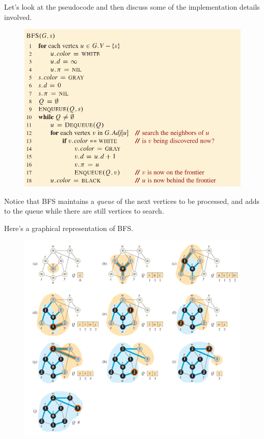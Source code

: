 \documentclass[12pt]{article}
\begin{document}
Let's look at the pseudocode and then discuss some of the implementation details involved. 

\begin{figure}[h]
    \includegraphics[width=\textwidth]{bfs-pseudocode.png}
\end{figure}

Notice that BFS maintains a \textit{queue} of the next vertices to be processed, and adds to the queue while there are still vertices to search. 

Here's a graphical representation of BFS.

\begin{figure}[h]
    \includegraphics[width=\textwidth]{bfs.png}
\end{figure}
\end{document}
